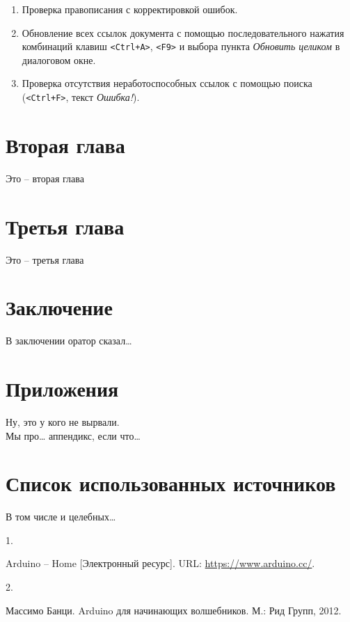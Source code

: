 \documentclass[
  a4paper,
]{book}
\providecommand{\tightlist}{%
  \setlength{\itemsep}{0pt}\setlength{\parskip}{0pt}}
\newlength{\cslhangindent}
\newlength{\csllabelwidth}
\newlength{\cslentryspacing}
\newcommand{\CSLLeftMargin}[1]{\parbox[t]{\csllabelwidth}{#1}}
\newcommand{\CSLRightInline}[1]{\parbox[t]{\linewidth - \csllabelwidth}{#1}\break}
\theoremstyle{definition}
\theoremstyle{definition}
\theoremstyle{definition}
\theoremstyle{definition}
\theoremstyle{remark}
\begin{document}
\begin{itemize}
  \begin{enumerate}
  \def\labelenumi{\arabic{enumi}.}
  \tightlist
  \item
    Проверка правописания с корректировкой ошибок.
  \item
    Обновление всех ссылок документа с помощью последовательного нажатия комбинаций клавиш \texttt{\textless{}Ctrl+A\textgreater{}}, \texttt{\textless{}F9\textgreater{}} и выбора пункта \emph{Обновить целиком} в диалоговом окне.
  \item
    Проверка отсутствия неработоспособных ссылок с помощью поиска (\texttt{\textless{}Ctrl+F\textgreater{}}, текст \emph{Ошибка!}).
  \end{enumerate}
\end{itemize}

\chapter{Вторая глава}\label{chapter2}

Это -- вторая глава

\chapter{Третья глава}\label{chapter3}

Это -- третья глава

\chapter*{Заключение}\label{conclusion}

В заключении оратор сказал\ldots{}

\chapter*{Приложения}\label{appendix}

Ну, это у кого не вырвали.\\
Мы про\ldots{} аппендикс, если что\ldots{}

\chapter*{Список использованных источников}\label{references}

В том числе и целебных\ldots{}

\label{refs}
\setlength{\cslhangindent}{0em}
\setlength{\cslentryspacing}{0em}
\begin{CSLReferences}
\CSLLeftMargin{1. }%
\CSLRightInline{Arduino -- Home {[}Электронный ресурс{]}. URL: \url{https://www.arduino.cc/}.}

\CSLLeftMargin{2. }%
\CSLRightInline{Массимо Банци. Arduino для начинающих волшебников. М.: Рид Групп, 2012.}

\end{CSLReferences}
\end{document}
